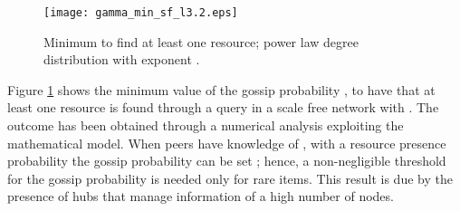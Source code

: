 \documentclass{sig-alternate}
\begin{document}
\begin{figure*}[thbp]
   \vspace{-0.5cm}
   \centering
 \hspace{5mm}
\caption{Average amount of query hits; power law degree distribution with exponent . Results are shown for . When  is considered, the model returns an  amount of query hits regardless of  values (hence not shown in the figure); simulation results confirmed that a high majority of nodes is reached and that queries percolate through the net.}
   \label{fig:sf_res}
     \vspace{-0.5cm}
\end{figure*}


\begin{figure}[thbp]
   \centering
   \texttt{[image: gamma\_min\_sf\_l3.2.eps]}
\caption{Minimum  to find at least one resource; power law degree distribution with exponent .}
   \label{fig:one_res_sf}
   \vspace{-0.2cm}
\end{figure}

Figure \ref{fig:one_res_sf} shows the minimum value of the gossip probability , to have that at least one resource is found through a query in a scale free network with . The outcome has been obtained through a numerical analysis exploiting the mathematical model. When peers have knowledge of , with a resource presence probability  the gossip probability can be set ; hence, a non-negligible threshold for the gossip probability is needed only for rare items. This result is due by the presence of hubs that manage information of a high number of nodes.

\begin{figure*}[thbp]
   \centering
 \hspace{5mm}
 \hspace{5mm}
 \hspace{5mm}
\caption{ value to obtain an infinite amount of query hits; scale-free network topologies with different power law distributions.}
\label{fig:soglie}
\end{figure*}
\end{document}
